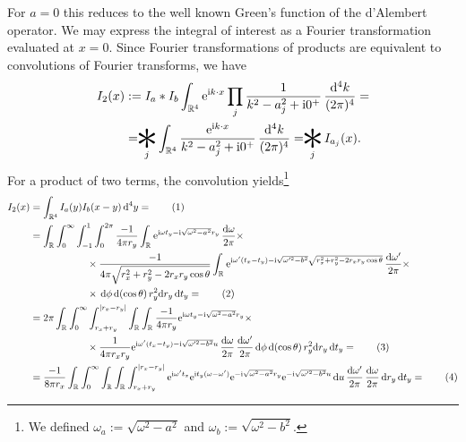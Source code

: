 \documentclass[english, parskip=full]{scrartcl}
\newcommand\numberthis{\addtocounter{equation}{1}\tag{\theequation}}
\newcommand{\intx}{}
\newcommand{\intr}{}
\renewcommand{\i}{\text{i}}
\newcommand{\e}{\text{e}}
\newcommand{\conv}{\mathop{\scalebox{3.5}{\raisebox{-0.38ex}{\makebox[0.5\width][c]{$\ast$}}}}\limits}
\begin{document}
For $a=0$ this reduces to the well known Green's function of the d'Alembert operator.
We may express the integral of interest as a Fourier transformation evaluated at $x=0$.
Since Fourier transformations of products are equivalent to convolutions of Fourier transforms, we have
\begin{align}
I_2(x) &:= I_a \ast I_b \intr\int_{\mathbb{R}^{4}} \e^{\i k\cdot x} \prod_j \frac{1}{k^2 - a_j^2 + \i 0^+} \, \frac{\mathrm{d}^{4}k}{(2\pi)^4} = \\
&= \conv_j\ \intr\int_{\mathbb{R}^{4}} \frac{\e^{\i k\cdot x}}{k^2 - a_j^2 + \i 0^+} \, \frac{\mathrm{d}^{4}k}{(2\pi)^4} = \conv_j\ I_{a_j}(x).
\end{align}
For a product of two terms, the convolution yields\footnote{We defined $\omega_a := \sqrt{\omega^2 - a^2}$ and $\omega_b := \sqrt{\omega^2 - b^2}$.}
\begin{align*}
I_2(x) &= \intr\int_{\mathbb{R}^{4}} I_a(y) I_b(x - y) \, \mathrm{d}^{4}y =  \numberthis \\
&= \intr\int_{\mathbb{R}^{ }} \intx\int_{0}^{\infty} \intx\int_{-1}^{1} \intx\int_{0}^{2\pi} \frac{-1}{4\pi r_y} \intr\int_{\mathbb{R}^{ }} \e^{\i\omega t_y - \i\sqrt{\omega^2 - a^2}r_y} \, \frac{\mathrm{d}\omega}{2\pi} \times \\
&\hspace{2cm} \times \frac{-1}{4\pi \sqrt{r_x^2 + r_y^2 - 2r_xr_y \cos \theta}} \intr\int_{\mathbb{R}^{ }} \e^{\i\omega' (t_x - t_y) - \i\sqrt{\omega'^2 - b^2} \sqrt{r_x^2 + r_y^2 - 2r_xr_y \cos \theta}} \, \frac{\mathrm{d}\omega'}{2\pi} \times \\
&\hspace{2cm} \times \, \mathrm{d}\phi\, \mathrm{d} (\cos\theta) \, r_y^2\mathrm{d}r_y \, \mathrm{d}t_y =  \numberthis \\
&= 2\pi \intr\int_{\mathbb{R}^{ }} \intx\int_{0}^{\infty} \intx\int_{r_x + r_y}^{|r_x - r_y|} \intr\int_{\mathbb{R}^{ }} \intr\int_{\mathbb{R}^{ }} \frac{-1}{4\pi r_y}  \e^{\i\omega t_y - \i\sqrt{\omega^2 - a^2}r_y}  \times \\
&\hspace{2cm} \times \frac{1}{4\pi r_xr_y} \e^{\i\omega' (t_x - t_y) - \i\sqrt{\omega'^2 - b^2} u} \, \frac{\mathrm{d}\omega}{2\pi} \, \frac{\mathrm{d}\omega'}{2\pi} \, \mathrm{d}\phi\, \mathrm{d} (\cos\theta) \, r_y^2\mathrm{d}r_y \, \mathrm{d}t_y = \numberthis  \\
&= \frac{-1}{8\pi r_x} \intr\int_{\mathbb{R}^{}} \intx\int_{0}^{\infty} \intr\int_{\mathbb{R}^{}} \intr\int_{\mathbb{R}^{ }} \intx\int_{r_x + r_y}^{|r_x - r_y|} \e^{\i\omega' t_x} \e^{\i t_y (\omega - \omega')} \e^{-\i\sqrt{\omega^2 - a^2} r_y} \e^{-\i\sqrt{\omega'^2 - b^2} u} \, \mathrm{d}u \, \frac{\mathrm{d}\omega'}{2\pi} \, \frac{\mathrm{d}\omega}{2\pi} \, \mathrm{d}r_y \, \mathrm{d}t_y = \numberthis  \\

\end{align*}
\end{document}
